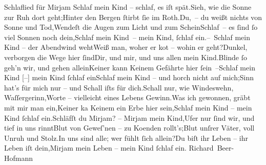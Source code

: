 \begin{ledgroupsized}[t]{13cm}
        \addtolength\longestz{1em}
        \addtolength\longestd{1em}
      \pstart\noindent{}
                  \pend\pstart\noindent{}
                  \pend\pstart\noindent{}
                  \pend{\bigskip}\pstart
           \noindent{}{\pb}Schlaflied für Mirjam\pend
           {\bigskip}\stanza{}Schlaf mein Kind – schlaf, es iſt spät.\newverse{}Sieh, wie die Sonne zur Ruh dort geht;\newverse{}Hinter den Bergen ſtirbt ſie im Roth.\newverse{}Du, – du weißt nichts von Sonne und Tod,\newverse{}Wendeſt die Augen zum Licht und zum Schein\newverse{}Schlaf – es ſind ſo viel Sonnen noch dein,\newverse{}Schlaf mein Kind – mein Kind, ſchlaf ein.\stanzaend{}\stanza{}– Schlaf mein Kind – der Abendwind weht\newverse{}Weiß man, woher er ko{\geminationm}t – wohin er geht?\newverse{}Dunkel, verborgen die Wege hier ſind\newverse{}Dir, und mir, und uns allen mein Kind.\newverse{}Blinde ſo geh’n wir, und gehen allein\newverse{}Keiner kann Keinem Gefährte hier ſein –\newverse{}Schlaf mein Kind {[}–{]} mein Kind ſchlaf ein\stanzaend{}\stanza{}{\pb}Schlaf mein Kind – und horch
                     nicht auf mich;\newverse{}Sinn hat’s für mich nur – und Schall iſts für dich.\newverse{}Schall nur, wie Windeswehn, Waſſergerinn,\newverse{}Worte – vielleicht eines Lebens Gewinn.\newverse{}Was ich gewonnen, gräbt mit mir man ein,\newverse{}Keiner ka{\geminationn} Keinem ein Erbe hier sein,\newverse{}Schlaf mein Kind – mein Kind ſchlaf ein.\stanzaend{}\stanza{}Schläfſt du Mirjam? – Mirjam mein Kind,\newverse{}Ufer nur ſind wir, und tief in uns rinnt\newverse{}Blut von Geweſ’nen – zu Ko{\geminationm}enden rollt’s;\newverse{}Blut unſrer Väter, voll Unruh und Stolz.\newverse{}In uns sind alle; wer fühlt ſich allein?\newverse{}Du biſt ihr Leben – ihr Leben iſt dein,\newverse{}Mirjam mein Leben – mein Kind ſchlaf
                     ein.\stanzaend{}\pstart
           \spacefill\mbox{Richard Beer-Hofmann}\pend
           \endnumbering{}\end{ledgroupsized}  \newcommand{\dateiname}{L00806}\newcommand{\titel}{Arthur Schnitzler an Richard Beer-Hofmann, 17. 6. 1898}\newcommand{\editorInnen}{Martin Anton Müller und Gerd-Hermann Susen}
      